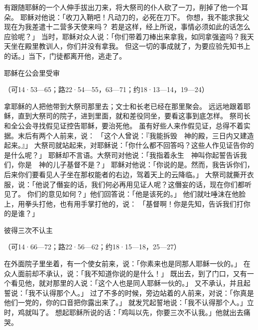 {有跟随耶稣的一个人伸手拔出刀来，将大祭司的仆人砍了一刀，削掉了他一个耳朵。
耶稣对他说：「收刀入鞘吧！凡动刀的，必死在刀下。
你想，我不能求我父现在为我差遣十二营多天使来吗？
若是这样，经上所说，事情必须如此的话怎么应验呢？」
当时，耶稣对众人说：「你们带着刀棒出来拿我，如同拿强盗吗？我天天坐在殿里教训人，你们并没有拿我。
但这一切的事成就了，为要应验先知书上的话。」当下，门徒都离开他，逃走了。
\par }{\SH 耶稣在公会里受审
\par }{\R （可14·53—65；路22·54—55，63—71；约18·13—14，19—24）
\par }{\PP {}拿耶稣的人把他带到大祭司{}那里去；文士和长老已经在那里聚会。
远远地跟着耶稣，直到大祭司的院子，进到里面，就和差役同坐，要看这事到底怎样。
祭司长和全公会寻找假见证控告耶稣，要治死他。
虽有好些人来作假见证，总得不着实据。末后有两个人前来，说：
「这个人曾说：『我能拆毁　神的殿，三日内又建造起来。』」
大祭司就站起来，对耶稣说：「你什么都不回答吗？这些人作见证告你的是什么呢？」
耶稣却不言语。大祭司对他说：「我指着永生　神叫你起誓告诉我们，你是　神的儿子基督不是？」
耶稣对他说：「你说的是。然而，我告诉你们，后来你们要看见人子坐在那权能者的右边，驾着天上的云降临。」
大祭司就撕开衣服，说：「他说了僭妄的话，我们何必再用见证人呢？这僭妄的话，现在你们都听见了。
你们的意见如何？」他们回答说：「他是该死的。」
他们就吐唾沫在他脸上，用拳头打他，也有用手掌打他的，说：
「基督啊！你是先知，告诉我们打你的是谁？」
\par }{\SH 彼得三次不认主
\par }{\R （可14·66—72；路22·56—62；约18·15—18，25—27）
\par }{\PP {}在外面院子里坐着，有一个使女前来，说：「你素来也是同那{}人耶稣一伙的。」
在众人面前却不承认，说：「我不知道你说的是什么！」
既出去，到了门口，又有一个{}看见他，就对那里的人说：「这个人也是同{}人耶稣一伙的。」
又不承认，并且起誓说：「我不认得那个人。」
过了不多的时候，旁边站着的人前来，对{}说：「你真是他们一党的，你的口音把你露出来了。」
就发咒起誓地说：「我不认得那个人。」立时，鸡就叫了。
想起耶稣所说的话：「鸡叫以先，你要三次不认我。」他就出去痛哭。

}
